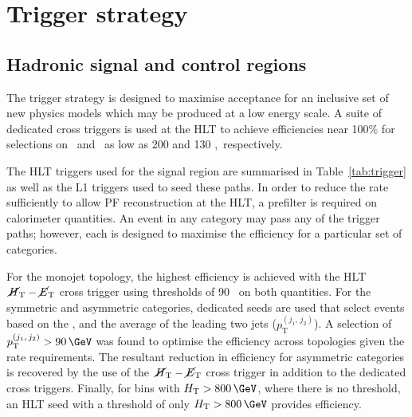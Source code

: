 \section{Trigger strategy}
\label{sec:ana-trigger}

\subsection{Hadronic signal and control regions}

The trigger strategy is designed to maximise acceptance for an inclusive set of new physics 
models which may be produced at a low energy scale. A suite of dedicated cross triggers 
is used at the HLT to achieve efficiencies near 100\% for selections on
\scalht~and \mht~as low as 200 and 130 \GeV,~respectively. 

The HLT triggers used for the signal region are summarised in Table~\ref{tab:trigger} as well as the L1 triggers
used to seed these paths. In order to reduce the rate sufficiently to allow PF reconstruction at the HLT,
a prefilter is required on calorimeter quantities. An event in any category may pass any of the trigger
paths; however, each is designed to maximise the efficiency for a particular set of categories.

For the monojet topology, the highest efficiency is achieved with the HLT
$\mbox{$\,\cancel{H}_{\rm T}$}-\mbox{$\cancel{E}_\text{T}$}$ cross trigger using thresholds of 90 \GeV~on both quantities. For the symmetric and asymmetric
categories, dedicated seeds are used that select events based on the \alphat, \scalht and the 
average \pt of the leading two jets ($p^{(j_1,\,j_2)}_{\text{T}}$). A selection of
$p^{(j_1,\,j_2)}_{\text{T}} > 90\,\GeV$ was found to optimise the efficiency across topologies given the rate requirements. The resultant reduction in efficiency for 
asymmetric categories is recovered by the use of the $\mbox{$\,\cancel{H}_{\rm T}$}-\mbox{$\cancel{E}_\text{T}$}$ cross trigger in addition to the dedicated cross triggers.
Finally, for bins with $\scalht > 800 \,\GeV$, where there is no \alphat threshold, 
an HLT seed with a threshold of only $\scalht > 800\,\GeV$ provides efficiency.


